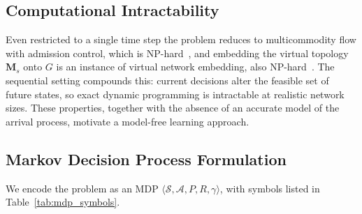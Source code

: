 \documentclass[10pt,journal,comsoc]{IEEEtran}
\begin{document}
\subsection{Computational Intractability}
Even restricted to a single time step the problem reduces to
multicommodity flow with admission control, which is
NP-hard~\cite{hall2007multicommodity}, and embedding the virtual topology
$\mathbf{M}_s$ onto $G$ is an instance of virtual network embedding,
also NP-hard~\cite{rost2020hardness}. The sequential setting compounds
this: current decisions alter the feasible set of future states, so exact
dynamic programming is intractable at realistic network sizes. These
properties, together with the absence of an accurate model of the arrival
process, motivate a model-free learning approach.

\subsection{Markov Decision Process Formulation}
We encode the problem as an MDP $\langle \mathcal{S}, \mathcal{A}, P, R,
\gamma \rangle$, with symbols listed in Table~\ref{tab:mdp_symbols}.
\end{document}
